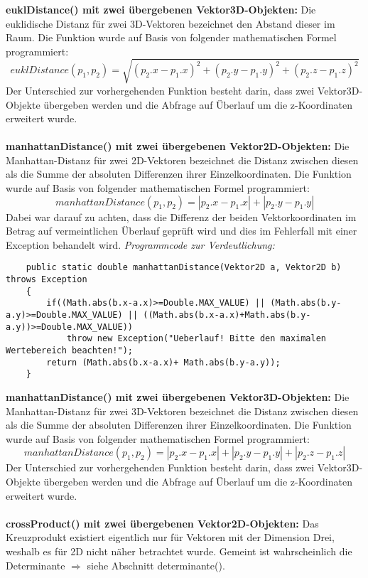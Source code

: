 \documentclass[a4paper,11pt]{scrartcl}
\begin{document}
\textbf{euklDistance() mit zwei übergebenen Vektor3D-Objekten:} Die euklidische Distanz für zwei 3D-Vektoren bezeichnet den Abstand dieser im Raum. Die Funktion wurde auf Basis von folgender mathematischen Formel programmiert:
\[ euklDistance(p_1,p_2) = \sqrt{(p_2.x - p_1.x)^2 + (p_2.y - p_1.y)^2 + (p_2.z - p_1.z)^2} \]
Der Unterschied zur vorhergehenden Funktion besteht darin, dass zwei Vektor3D-Objekte übergeben werden und die Abfrage auf Überlauf um die z-Koordinaten erweitert wurde.\\
\\
\textbf{manhattanDistance() mit zwei übergebenen Vektor2D-Objekten:} Die Manhattan-Distanz für zwei 2D-Vektoren bezeichnet die Distanz zwischen diesen als die Summe der absoluten Differenzen ihrer Einzelkoordinaten. Die Funktion wurde auf Basis von folgender mathematischen Formel programmiert:
\[ manhattanDistance(p_1,p_2) = | p_2.x - p_1.x | + | p_2.y - p_1.y | \]
Dabei war darauf zu achten, dass die Differenz der beiden Vektorkoordinaten im Betrag auf vermeintlichen Überlauf geprüft wird und dies im Fehlerfall mit einer Exception behandelt wird.
\textit{Programmcode zur Verdeutlichung:}
\begin{lstlisting}
	public static double manhattanDistance(Vektor2D a, Vektor2D b) throws Exception
	{
		if((Math.abs(b.x-a.x)>=Double.MAX_VALUE) || (Math.abs(b.y-a.y)>=Double.MAX_VALUE) || ((Math.abs(b.x-a.x)+Math.abs(b.y-a.y))>=Double.MAX_VALUE))
			throw new Exception("Ueberlauf! Bitte den maximalen Wertebereich beachten!");
		return (Math.abs(b.x-a.x)+ Math.abs(b.y-a.y));
	}
\end{lstlisting} $\;$ \\
\textbf{manhattanDistance() mit zwei übergebenen Vektor3D-Objekten:} Die Manhattan-Distanz für zwei 3D-Vektoren bezeichnet die Distanz zwischen diesen als die Summe der absoluten Differenzen ihrer Einzelkoordinaten. Die Funktion wurde auf Basis von folgender mathematischen Formel programmiert:
\[ manhattanDistance(p_1,p_2) = | p_2.x - p_1.x | + | p_2.y - p_1.y | + | p_2.z - p_1.z |\]
Der Unterschied zur vorhergehenden Funktion besteht darin, dass zwei Vektor3D-Objekte übergeben werden und die Abfrage auf Überlauf um die z-Koordinaten erweitert wurde.\\
\\
\textbf{crossProduct() mit zwei übergebenen Vektor2D-Objekten:} Das Kreuzprodukt existiert eigentlich nur für Vektoren mit der Dimension Drei, weshalb es für 2D nicht näher betrachtet wurde. Gemeint ist wahrscheinlich die Determinante $\Rightarrow$ siehe Abschnitt determinante().\\ 
\end{document}
